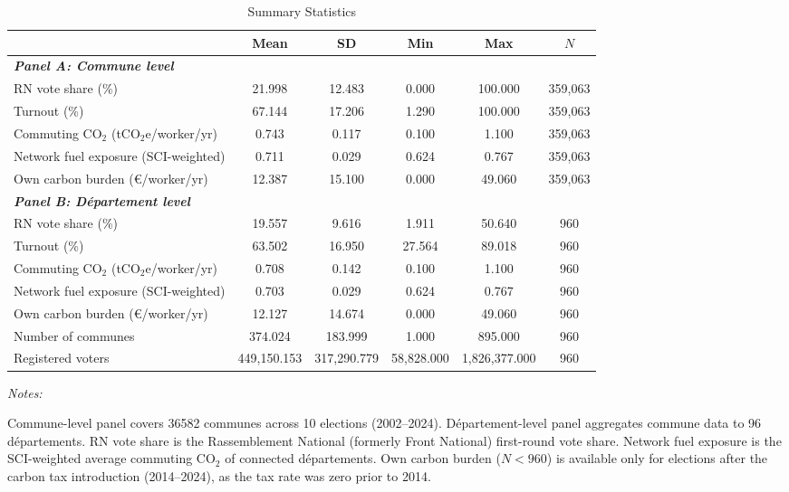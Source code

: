 \begin{table}[!h]
\centering
\caption{Summary Statistics}
\centering
\fontsize{10}{12}\selectfont
\begin{threeparttable}
\begin{tabular}[t]{lccccc}
\toprule
 & Mean & SD & Min & Max & $N$\\
\midrule
\textbf{\textit{Panel A: Commune level}} & \textbf{} & \textbf{} & \textbf{} & \textbf{} & \textbf{}\\
RN vote share (\%) & 21.998 & 12.483 & 0.000 & 100.000 & 359,063\\
Turnout (\%) & 67.144 & 17.206 & 1.290 & 100.000 & 359,063\\
Commuting CO$_2$ (tCO$_2$e/worker/yr) & 0.743 & 0.117 & 0.100 & 1.100 & 359,063\\
Network fuel exposure (SCI-weighted) & 0.711 & 0.029 & 0.624 & 0.767 & 359,063\\
Own carbon burden (\euro/worker/yr) & 12.387 & 15.100 & 0.000 & 49.060 & 359,063\\
\textbf{\textit{Panel B: D\'{e}partement level}} & \textbf{} & \textbf{} & \textbf{} & \textbf{} & \textbf{}\\
RN vote share (\%) & 19.557 & 9.616 & 1.911 & 50.640 & 960\\
Turnout (\%) & 63.502 & 16.950 & 27.564 & 89.018 & 960\\
Commuting CO$_2$ (tCO$_2$e/worker/yr) & 0.708 & 0.142 & 0.100 & 1.100 & 960\\
Network fuel exposure (SCI-weighted) & 0.703 & 0.029 & 0.624 & 0.767 & 960\\
Own carbon burden (\euro/worker/yr) & 12.127 & 14.674 & 0.000 & 49.060 & 960\\
Number of communes & 374.024 & 183.999 & 1.000 & 895.000 & 960\\
Registered voters & 449,150.153 & 317,290.779 & 58,828.000 & 1,826,377.000 & 960\\
\bottomrule
\end{tabular}
\begin{tablenotes}
\item \textit{Notes:} 
\item Commune-level panel covers 36582 communes across 10 elections (2002--2024). D\'{e}partement-level panel aggregates commune data to 96 d\'{e}partements. RN vote share is the Rassemblement National (formerly Front National) first-round vote share. Network fuel exposure is the SCI-weighted average commuting CO$_2$ of connected d\'{e}partements. Own carbon burden ($N < 960$) is available only for elections after the carbon tax introduction (2014--2024), as the tax rate was zero prior to 2014.
\end{tablenotes}
\end{threeparttable}
\end{table}
